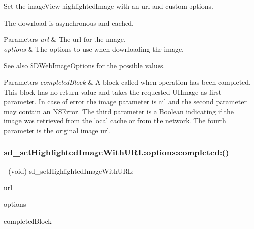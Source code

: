 Set the image\+View {\ttfamily highlighted\+Image} with an {\ttfamily url} and custom options.

The download is asynchronous and cached.


\begin{DoxyParams}{Parameters}
{\em url} & The url for the image. \\
\hline
{\em options} & The options to use when downloading the image. \\
\hline
\end{DoxyParams}
\begin{DoxySeeAlso}{See also}
S\+D\+Web\+Image\+Options for the possible values. 
\end{DoxySeeAlso}

\begin{DoxyParams}{Parameters}
{\em completed\+Block} & A block called when operation has been completed. This block has no return value and takes the requested U\+I\+Image as first parameter. In case of error the image parameter is nil and the second parameter may contain an N\+S\+Error. The third parameter is a Boolean indicating if the image was retrieved from the local cache or from the network. The fourth parameter is the original image url. \\
\hline
\end{DoxyParams}
\mbox{\label{category_u_i_image_view_07_highlighted_web_cache_08_a3bbfcd1433513161520293acac8f9fff}} 
\subsubsection{\texorpdfstring{sd\+\_\+set\+Highlighted\+Image\+With\+U\+R\+L\+:options\+:completed\+:()}{sd\_setHighlightedImageWithURL:options:completed:()}\hspace{0.1cm}{\footnotesize\ttfamily [2/3]}}
{\footnotesize\ttfamily -\/ (void) sd\+\_\+set\+Highlighted\+Image\+With\+U\+R\+L\+: \begin{DoxyParamCaption}\item[{(N\+S\+U\+RL $\ast$)}]{url }\item[{options:(S\+D\+Web\+Image\+Options)}]{options }\item[{completed:(S\+D\+Web\+Image\+Completion\+Block)}]{completed\+Block }\end{DoxyParamCaption}}

